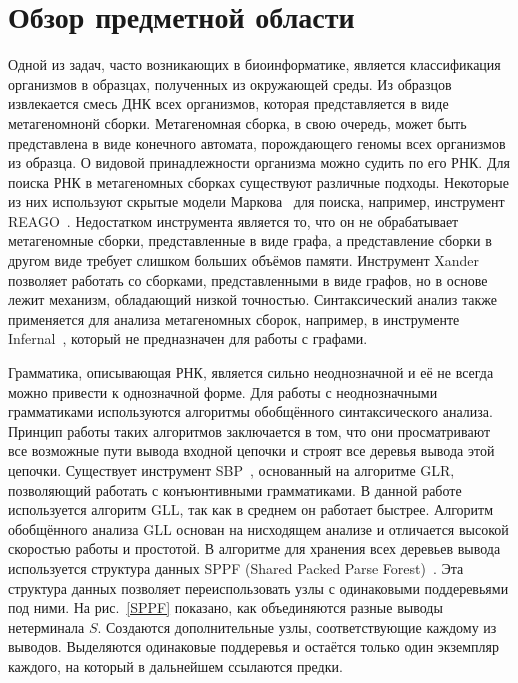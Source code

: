 
\section{Обзор предметной области}
Одной из задач, часто возникающих в биоинформатике, является классификация организмов в образцах, полученных из окружающей среды. Из образцов извлекается смесь ДНК всех организмов, которая представляется в виде метагеномнонй сборки. Метагеномная сборка, в свою очередь, может быть представлена в виде конечного автомата, порождающего геномы всех организмов из образца. О видовой принадлежности организма можно судить по его РНК. Для поиска РНК в метагеномных сборках существуют различные подходы. Некоторые из них используют скрытые модели Маркова~\cite{markov} для поиска, например, инструмент REAGO~\cite{REAGO}. Недостатком инструмента является то, что он не обрабатывает метагеномные сборки, представленные в виде графа, а представление сборки в другом виде требует слишком больших объёмов памяти. Инструмент Xander~\cite{Xander} позволяет работать со сборками, представленными в виде графов, но в основе лежит механизм, обладающий низкой точностью. Синтаксический анализ также применяется для анализа метагеномных сборок, например, в инструменте Infernal~\cite{Infernal}, который не предназначен для работы с графами.

Грамматика, описывающая РНК, является сильно неоднозначной и её не всегда можно привести к однозначной форме. Для работы с неоднозначными грамматиками используются алгоритмы обобщённого синтаксического анализа. Принцип работы таких алгоритмов заключается в том, что они просматривают все возможные пути вывода входной цепочки и строят все деревья вывода этой цепочки. Существует инструмент SBP~\cite{SBP}, основанный на алгоритме GLR, позволяющий работать с конъюнтивными грамматиками. В данной работе используется алгоритм GLL, так как в среднем он работает быстрее. Алгоритм обобщённого анализа GLL основан на нисходящем анализе и отличается высокой скоростью работы и простотой. В алгоритме для хранения всех деревьев вывода используется структура данных SPPF (Shared Packed Parse Forest)~\cite{SPPF}. Эта структура данных позволяет переиспользовать узлы с одинаковыми поддеревьями под ними. На рис.~\ref{SPPF} показано, как объединяются разные выводы нетерминала $S$. Создаются дополнительные узлы, соответствующие каждому из выводов. Выделяются одинаковые поддеревья и остаётся только один экземпляр каждого, на который в дальнейшем ссылаются предки.

